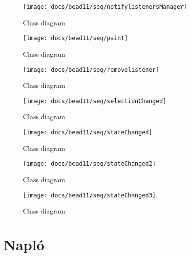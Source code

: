 \documentclass[../../projlab]{subfiles}
\begin{document}
\begin{figure}[H] 
    \centering 
    \texttt{[image: docs/bead11/seq/notifylistenersManager]} 
    \caption{Class diagram} 
\end{figure} 

\begin{figure}[H] 
    \centering 
    \texttt{[image: docs/bead11/seq/paint]} 
    \caption{Class diagram} 
\end{figure} 

\begin{figure}[H] 
    \centering 
    \texttt{[image: docs/bead11/seq/removelistener]} 
    \caption{Class diagram} 
\end{figure}

\begin{figure}[H] 
    \centering 
    \texttt{[image: docs/bead11/seq/selectionChanged]} 
    \caption{Class diagram} 
\end{figure}

\begin{figure}[H] 
    \centering 
    \texttt{[image: docs/bead11/seq/stateChanged]} 
    \caption{Class diagram} 
\end{figure}

\begin{figure}[H] 
    \centering 
    \texttt{[image: docs/bead11/seq/stateChanged2]} 
    \caption{Class diagram} 
\end{figure}

\begin{figure}[H] 
    \centering 
    \texttt{[image: docs/bead11/seq/stateChanged3]} 
    \caption{Class diagram} 
\end{figure}


\newpage
\section{Napló}

\begin{naplo}
       
\end{naplo}
\end{document}
